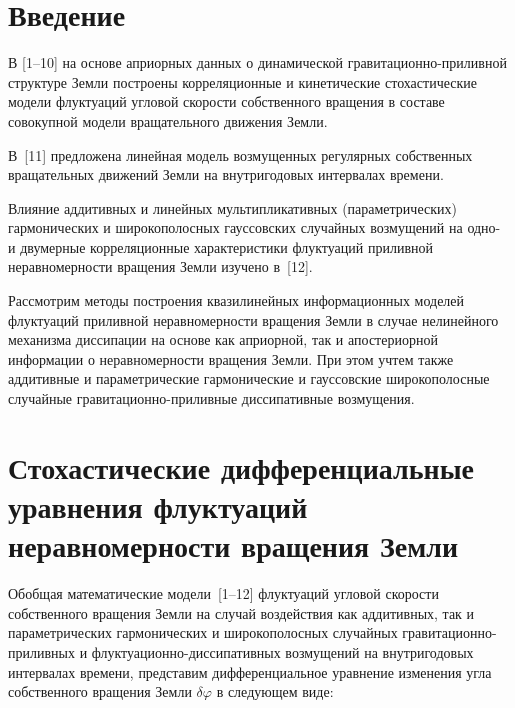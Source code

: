 

\thispagestyle{headings}

\begin{multicols}{2}

\section{Введение}  %

В [1--10] на основе априорных данных о динамической гравитационно-приливной
структуре Земли построены корреляционные и кинетические стохастические
модели флуктуаций угловой ско\-рости собственного вращения в составе совокупной
модели вращательного движения Земли.

В~[11] предложена линейная модель
возму\-щенных регулярных собственных вращательных движений Земли на
внутригодовых интервалах времени.

Влияние аддитивных и линейных мультипликативных (параметрических)
гармонических и широкополосных гауссовских случайных возмущений на
одно- и двумерные корреляционные характеристики флуктуаций приливной
неравномерности вращения Земли изучено в~[12].

Рассмотрим методы
построения квазилинейных информационных моделей флуктуаций приливной
неравномерности вращения Земли в случае нелинейного механизма диссипации
на основе как априорной, так и апостериорной информации о неравномерности
вращения Земли. При этом учтем также аддитивные и параметрические
гармонические и гауссовские широкополосные случайные
гравитационно-приливные диссипативные возмущения.


\section{Стохастические дифференциальные уравнения флуктуаций
неравномерности вращения Земли}  %

Обобщая математические модели~[1--12] флуктуаций угловой скорости
собственного вращения Земли на случай воздействия как аддитивных,
так и параметрических гармонических и широкополосных случайных
гравитационно-приливных и флуктуационно-диссипативных возмущений на
внутригодовых интервалах времени, представим дифференциальное
уравнение изменения угла собственного вращения  Земли $\delta \varphi$
в следующем виде:


\end{multicols}
